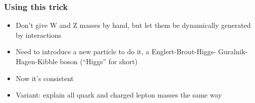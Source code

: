 \documentclass[compress]{beamer}
\begin{document}
\begin{frame}
\frametitle{Using this trick}

\begin{center}
\end{center}

\begin{itemize}
\item<1-> Don't give W and Z masses by hand, but let them be dynamically
  generated by interactions

\item<1-> Need to introduce a new particle to do it, a
  Englert-Brout-Higgs- Guralnik-Hagen-Kibble boson (``Higgs'' for short)

\item<1-> Now it's consistent

\item<2> Variant: explain all quark and charged lepton masses
  the same way
\end{itemize}
\end{frame}
\end{document}

